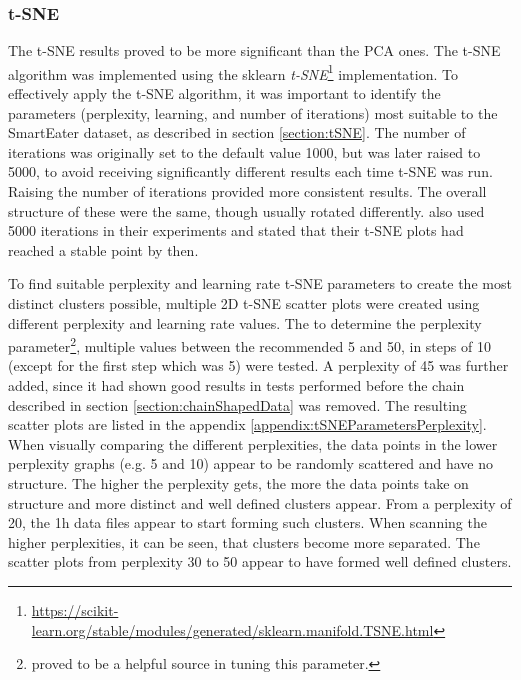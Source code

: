 \subsubsection{t-SNE}
\label{section:experimentTSNE}
The t-SNE results proved to be more significant than the PCA ones. The t-SNE algorithm was implemented using the sklearn \textit{t-SNE}\footnote{\url{https://scikit-learn.org/stable/modules/generated/sklearn.manifold.TSNE.html}} implementation.
To effectively apply the t-SNE algorithm, it was important to identify the parameters (perplexity, learning, and number of iterations) most suitable to the SmartEater dataset, as described in section \ref{section:tSNE}. The number of iterations was originally set to the default value 1000, but was later raised to 5000, to avoid receiving significantly different results each time t-SNE was run. Raising the number of iterations provided more consistent results. The overall structure of these were the same, though usually rotated differently. \textcite{wattenberg2016how} also used 5000 iterations in their experiments and stated that their t-SNE plots had reached a stable point by then.

To find suitable perplexity and learning rate t-SNE parameters to create the most distinct clusters possible, multiple 2D t-SNE scatter plots were created using different perplexity and learning rate values. 
The to determine the perplexity parameter\footnote{\textcite{wattenberg2016how} proved to be a helpful source in tuning this parameter.}, multiple values between the recommended 5 and 50, in steps of 10 (except for the first step which was 5) were tested. A perplexity of 45 was further added, since it had shown good results in tests performed before the chain described in section \ref{section:chainShapedData} was removed. The resulting scatter plots are listed in the appendix \ref{appendix:tSNEParametersPerplexity}. When visually comparing the different perplexities, the data points in the lower perplexity graphs (e.g. 5 and 10) appear to be randomly scattered and have no structure. The higher the perplexity gets, the more the data points take on structure and more distinct and well defined clusters appear. From a perplexity of 20, the 1h data files appear to start forming such clusters. When scanning the higher perplexities, it can be seen, that clusters become more separated. The scatter plots from perplexity 30 to 50 appear to have formed well defined clusters. 

